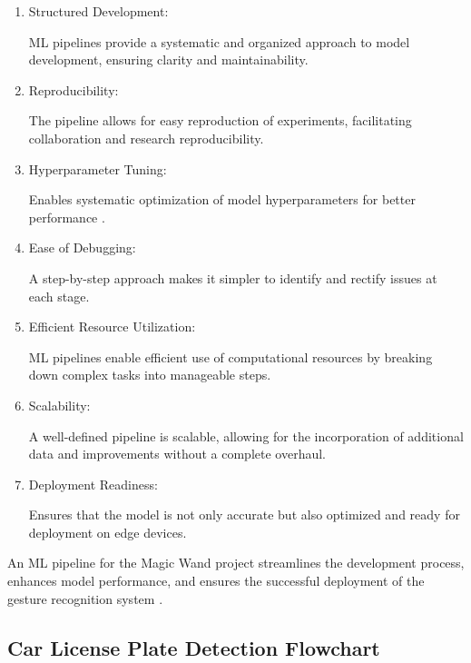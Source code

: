 		\begin{enumerate}
			
			\item Structured Development: 
			
			ML pipelines provide a systematic and organized approach to model development, ensuring clarity and maintainability.
			
			\item Reproducibility: 
			
			The pipeline allows for easy reproduction of experiments, facilitating collaboration and research reproducibility.
			
			\item Hyperparameter Tuning: 
			
			Enables systematic optimization of model hyperparameters for better performance \cite{Cong:2022}.
			
			\item Ease of Debugging:
			
			A step-by-step approach makes it simpler to identify and rectify issues at each stage.
			
			\item Efficient Resource Utilization: 
			
			ML pipelines enable efficient use of computational resources by breaking down complex tasks into manageable steps.
			
			\item Scalability: 
			
			A well-defined pipeline is scalable, allowing for the incorporation of additional data and improvements without a complete overhaul.
			
			\item Deployment Readiness: 
			
			Ensures that the model is not only accurate but also optimized and ready for deployment on edge devices.
			
		\end{enumerate}
	
	An ML pipeline for the Magic Wand project streamlines the development process, enhances model performance, and ensures the successful deployment of the gesture recognition system \cite{Zhou:2020}.
	
	\subsection{Car License Plate Detection Flowchart}
	

